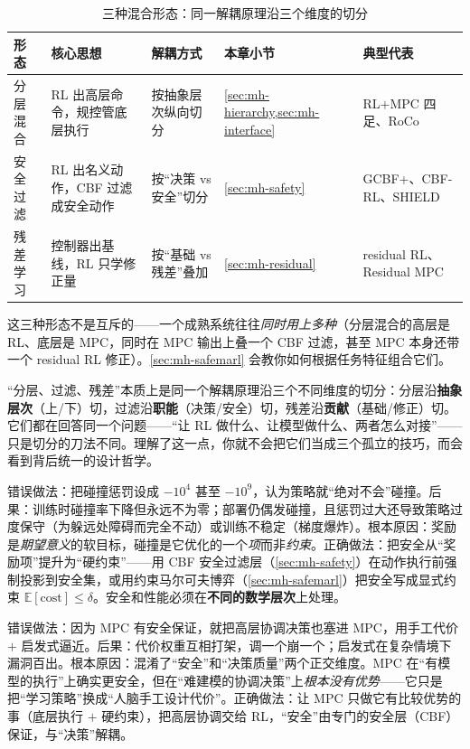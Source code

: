\begin{table}[H]\centering\small
\caption{三种混合形态：同一解耦原理沿三个维度的切分}
\label{tab:mh-forms}
\begin{tabular}{p{2.4cm}p{3.4cm}p{2.8cm}p{2.0cm}p{2.4cm}}
\toprule
形态 & 核心思想 & 解耦方式 & 本章小节 & 典型代表 \\
\midrule
分层混合 & RL 出高层命令，规控管底层执行 & 按抽象层次纵向切分 & \cref{sec:mh-hierarchy,sec:mh-interface} & RL$+$MPC 四足、RoCo \\
安全过滤 & RL 出名义动作，CBF 过滤成安全动作 & 按“决策 vs 安全”切分 & \cref{sec:mh-safety} & GCBF+、CBF-RL、SHIELD \\
残差学习 & 控制器出基线，RL 只学修正量 & 按“基础 vs 残差”叠加 & \cref{sec:mh-residual} & residual RL、Residual MPC \\
\bottomrule
\end{tabular}
\end{table}

\noindent 这三种形态不是互斥的——一个成熟系统往往\emph{同时用上多种}（分层混合的高层是 RL、底层是 MPC，同时在 MPC 输出上叠一个 CBF 过滤，甚至 MPC 本身还带一个 residual RL 修正）。\cref{sec:mh-safemarl} 会教你如何根据任务特征组合它们。

\begin{insight}[分层、过滤、残差是同一原理的三种刀法]
“分层、过滤、残差”本质上是同一个解耦原理沿三个不同维度的切分：分层沿\textbf{抽象层次}（上/下）切，过滤沿\textbf{职能}（决策/安全）切，残差沿\textbf{贡献}（基础/修正）切。它们都在回答同一个问题——“让 RL 做什么、让模型做什么、两者怎么对接”——只是切分的刀法不同。理解了这一点，你就不会把它们当成三个孤立的技巧，而会看到背后统一的设计哲学。
\end{insight}

\begin{pitfall}
错误做法：把碰撞惩罚设成 $-10^4$ 甚至 $-10^9$，认为策略就“绝对不会”碰撞。后果：训练时碰撞率下降但永远不为零；部署仍偶发碰撞，且惩罚过大还导致策略过度保守（为躲远处障碍而完全不动）或训练不稳定（梯度爆炸）。根本原因：奖励是\emph{期望意义}的软目标，碰撞是它优化的一个\emph{项}而非\emph{约束}。正确做法：把安全从“奖励项”提升为“硬约束”——用 CBF 安全过滤层（\cref{sec:mh-safety}）在动作执行前强制投影到安全集，或用约束马尔可夫博弈（\cref{sec:mh-safemarl}）把安全写成显式约束 $\mathbb{E}[\text{cost}]\le\delta$。安全和性能必须在\textbf{不同的数学层次}上处理。
\end{pitfall}

\begin{pitfall}
错误做法：因为 MPC 有安全保证，就把高层协调决策也塞进 MPC，用手工代价 $+$ 启发式逼近。后果：代价权重互相打架，调一个崩一个；启发式在复杂情境下漏洞百出。根本原因：混淆了“安全”和“决策质量”两个正交维度。MPC 在“有模型的执行”上确实更安全，但在“难建模的协调决策”上\emph{根本没有优势}——它只是把“学习策略”换成“人脑手工设计代价”。正确做法：让 MPC 只做它有比较优势的事（底层执行 $+$ 硬约束），把高层协调交给 RL，“安全”由专门的安全层（CBF）保证，与“决策”解耦。
\end{pitfall}

